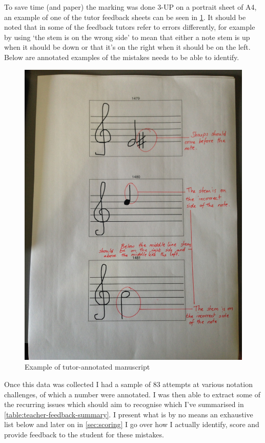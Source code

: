 To save time (and paper) the marking was done 3-UP on a portrait sheet of A4, an example of one of the tutor feedback sheets can be seen in \cref{fig:teacher-sheet}. It should be noted that in some of the feedback tutors refer to errors differently, for example by using `the stem is on the wrong side' to mean that either a note stem is up when it should be down or that it's on the right when it should be on the left. Below are annotated examples of the mistakes \noteED needs to be able to identify.

\begin{figure}[H]
  \centering
  \includegraphics[width=\linewidth]{gfx/photos/teacher-sheet-1.jpg}
  \caption{Example of tutor-annotated manuscript}
  \label{fig:teacher-sheet}
\end{figure}

Once this data was collected I had a sample of 83 attempts at various notation challenges, of which a number were annotated. I was then able to extract some of the recurring issues which \noteED should aim to recognise which I've summarised in \cref{table:teacher-feedback-summary}. I present what is by no means an exhaustive list below and later on in \cref{sec:scoring} I go over how I actually identify, score and provide feedback to the student for these mistakes.

